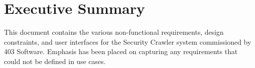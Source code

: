\section{Executive Summary}
	This document contains the various non-functional requirements, design constraints, and user interfaces for the Security Crawler system commissioned by 403 Software.  Emphasis has been placed on capturing any requirements that could not be defined in use cases.
